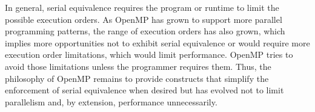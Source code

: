 In general, serial equivalence requires the program or runtime to limit
the possible execution orders. As OpenMP has grown to support more parallel 
programming patterns, the range of execution orders has also grown, which 
implies more opportunities not to exhibit serial equivalence or would require
more execution order limitations, which would limit performance. OpenMP tries 
to avoid those limitations unless the programmer requires them. Thus, the 
philosophy of OpenMP remains to provide constructs that simplify the 
enforcement of serial equivalence when desired but has evolved not 
to limit parallelism and, by extension, performance unnecessarily.


